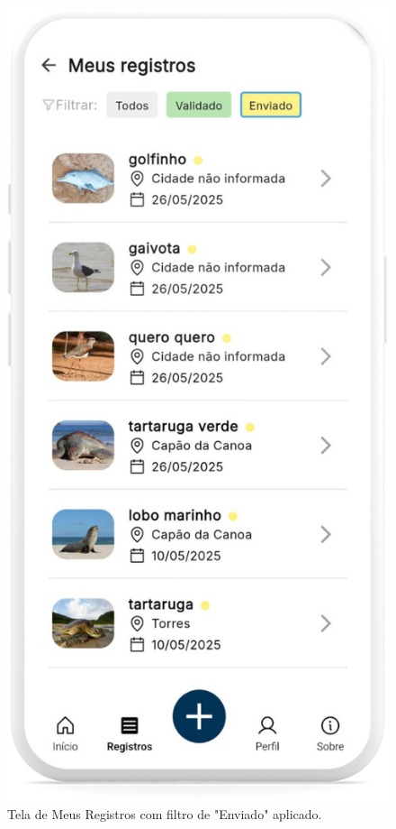 \begin{figure}[H]
\begin{minipage}[t]{0.48\textwidth}
    \end{minipage}
    \hfill
    \begin{minipage}[t]{0.48\textwidth}
        \centering
        \includegraphics[height=0.72\textheight]{imagens/sistema/device_frame/meusregistrosEnviado.png}
        \caption{Tela de Meus Registros com filtro de "Enviado" aplicado.}
        \label{fig:meus-registros-enviado}
    \end{minipage}
\end{figure}

